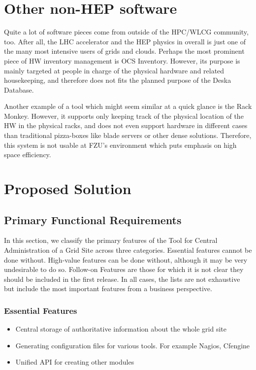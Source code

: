 \documentclass[12pt]{article}
\begin{document}
\section{Other non-HEP software}
Quite a lot of software pieces come from outside of the HPC/WLCG community, too.  After all, the LHC accelerator and the HEP
physics in overall is just one of the many most intensive users of grids and clouds.  Perhaps the most prominent piece of HW
inventory management is OCS Inventory.  However, its purpose is mainly targeted at people in charge of the physical hardware and
related housekeeping, and therefore does not fits the planned purpose of the Deska Database.

Another example of a tool which might seem similar at a quick glance is the Rack Monkey.  However, it supports only keeping track
of the physical location of the HW in the physical racks, and does not even support hardware in different cases than traditional
pizza-boxes like blade servers or other dense solutions.  Therefore, this system is not usable at FZU's environment which puts
emphasis on high space efficiency.

\section{Proposed Solution}

\subsection{Primary Functional Requirements}
In this section, we classify the primary features of the Tool for Central Administration of a Grid Site across three categories. 
Essential features cannot be done without. High-value features can be done without, although it may be very undesirable to do so. 
Follow-on Features are those for which it is not clear they should be included in the first release. In all cases, the lists are not 
exhaustive but include the most important features from a business perspective.

\subsubsection{Essential Features}
\begin{itemize}
	\item Central storage of authoritative information about the whole grid site
	\item Generating configuration files for various tools. For example Nagios, Cfengine
	\item Unified API for creating other modules
\end{itemize}
\end{document}
